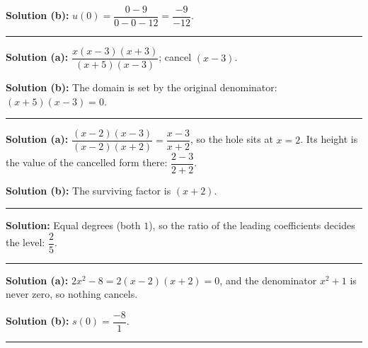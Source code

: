 \documentclass[12pt]{article}
\begin{document}
\textbf{Solution (b):} $u(0) = \dfrac{0-9}{0-0-12} = \dfrac{-9}{-12}$.

\vspace{0.2cm}\noindent\rule{\linewidth}{0.2pt}\vspace{0.2cm}


\textbf{Solution (a):} $\dfrac{x(x-3)(x+3)}{(x+5)(x-3)}$; cancel $(x-3)$.

\textbf{Solution (b):} The domain is set by the original denominator:
$(x+5)(x-3) = 0$. 

\vspace{0.2cm}\noindent\rule{\linewidth}{0.2pt}\vspace{0.2cm}


\textbf{Solution (a):} $\dfrac{(x-2)(x-3)}{(x-2)(x+2)} = \dfrac{x-3}{x+2}$, so the
hole sits at $x = 2$. Its height is the value of the cancelled form there:
$\dfrac{2-3}{2+2}$. 

\textbf{Solution (b):} The surviving factor is $(x+2)$. 

\vspace{0.2cm}\noindent\rule{\linewidth}{0.2pt}\vspace{0.2cm}


\textbf{Solution:} Equal degrees (both $1$), so the ratio of the leading
coefficients decides the level: $\dfrac{2}{5}$. 

\vspace{0.2cm}\noindent\rule{\linewidth}{0.2pt}\vspace{0.2cm}


\textbf{Solution (a):} $2x^2 - 8 = 2(x-2)(x+2) = 0$, and the denominator
$x^2+1$ is never zero, so nothing cancels. 

\textbf{Solution (b):} $s(0) = \dfrac{-8}{1}$. 

\vspace{0.2cm}\noindent\rule{\linewidth}{0.2pt}\vspace{0.2cm}
\end{document}
